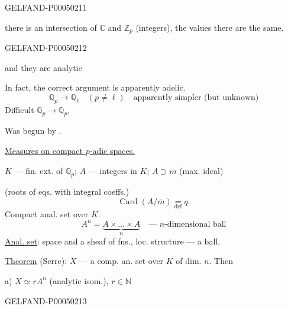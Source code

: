 \begin{GelfandAdjacentEvidence}{GELFAND-P000502}{11}

there is an intersection of $\mathbb C$ and $\mathbb Z_p$ (integers), the values there are the same.

\end{GelfandAdjacentEvidence}
\begin{GelfandAdjacentEvidence}{GELFAND-P000502}{12}

and they are analytic

In fact, the correct argument is apparently adelic.
\[
\mathbb Q_p\longrightarrow\mathbb Q_{\ell}\quad(p\ne\ell)\quad
\text{apparently simpler (but unknown)}
\]
Difficult $\mathbb Q_p\longrightarrow\mathbb Q_p$,

Was begun by .

\uline{Measures on compact \mbox{$p$}-adic spaces.}

$K$ — fin. ext. of $\mathbb Q_p$;\quad
$A$ — integers in $K$;\quad
$A\supset\overline m$ (max. ideal)

\hfill (roots of eqs. with integral coeffs.)
\[
\operatorname{Card}(A/\overline m)\underset{\mathrm{def}}{=}q.
\]
Compact anal. set over $K$.
\[
A^n=\underbrace{A\times\ldots\times A}_{n}
\quad\text{— $n$-dimensional ball}
\]
\uline{Anal. set}: space and a sheaf of fns., loc. structure — a ball.

\uline{Theorem} (Serre): $X$ — a comp. an. set over $K$ of dim. $n$. Then

a) $X\simeq rA^n$ (analytic isom.), $r\in\mathbb N$
\end{GelfandAdjacentEvidence}
\begin{GelfandAdjacentEvidence}{GELFAND-P000502}{13}


\end{GelfandAdjacentEvidence}
